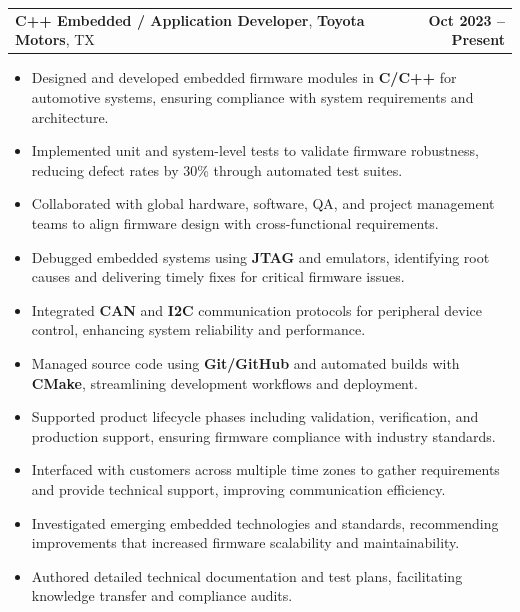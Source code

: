 \documentclass[letterpaper,11pt]{article}
\makeatletter
\newcommand{\resumeItem}[1]{
  \item\footnotesize{
    {#1 \vspace{-2pt}}
  }
}
\newcommand{\resumeSubheading}[4]{
  \vspace{-2pt}\item
    \begin{tabular*}{1.0\textwidth}[t]{l@{\extracolsep{\fill}}r}
      \textbf{\fontsize{10pt}{14pt}\selectfont #3}, \textbf{\fontsize{10pt}{14pt}\selectfont #1}, \fontsize{10pt}{14pt}\selectfont #4 & \textbf{\fontsize{10pt}{14pt}\selectfont #2} \\
    \end{tabular*}\vspace{-7pt}
}
\newcommand{\resumeItemListStart}{\begin{itemize}[leftmargin=*]}
\newcommand{\resumeItemListEnd}{\end{itemize}\vspace{-5pt}}
\makeatother
\begin{document}
    \resumeSubheading
        {Toyota Motors}{Oct 2023 -- Present}
        {C++ Embedded / Application Developer}{TX}
      \resumeItemListStart
        \resumeItem{Designed and developed embedded firmware modules in \textbf{C/C++} for automotive systems, ensuring compliance with system requirements and architecture.}
        \resumeItem{Implemented unit and system-level tests to validate firmware robustness, reducing defect rates by 30\% through automated test suites.}
        \resumeItem{Collaborated with global hardware, software, QA, and project management teams to align firmware design with cross-functional requirements.}
        \resumeItem{Debugged embedded systems using \textbf{JTAG} and emulators, identifying root causes and delivering timely fixes for critical firmware issues.}
        \resumeItem{Integrated \textbf{CAN} and \textbf{I2C} communication protocols for peripheral device control, enhancing system reliability and performance.}
        \resumeItem{Managed source code using \textbf{Git/GitHub} and automated builds with \textbf{CMake}, streamlining development workflows and deployment.}
        \resumeItem{Supported product lifecycle phases including validation, verification, and production support, ensuring firmware compliance with industry standards.}
        \resumeItem{Interfaced with customers across multiple time zones to gather requirements and provide technical support, improving communication efficiency.}
        \resumeItem{Investigated emerging embedded technologies and standards, recommending improvements that increased firmware scalability and maintainability.}
        \resumeItem{Authored detailed technical documentation and test plans, facilitating knowledge transfer and compliance audits.}
      \resumeItemListEnd
\end{document}
